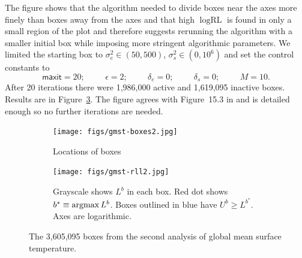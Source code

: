 \documentclass{report}
\newcommand{\textcompute}{\textsf}
\newcommand{\RLorig}{\text{RL}}
\newcommand{\logRLorig}{\log\RLorig}
\newcommand{\sigssq}{\sigma_s^2}
\newcommand{\sigesq}{\sigma_e^2}
\newcommand{\maxit}{\textcompute{maxit}}
\newcommand{\argmax}{\operatornamewithlimits{argmax}}
\begin{document}
The figure shows that the algorithm needed to divide boxes near the axes more finely than boxes away from the axes and that high $\logRLorig$ is found in only a small region of the plot and therefore suggests rerunning the algorithm with a smaller initial box while imposing more stringent algorithmic parameters.  We limited the starting box to $\sigesq\in(50,500)$, $\sigssq\in(0,10^6)$ and set the control constants to 
\begin{equation*}
	\maxit=20; \hspace{1cm} \epsilon=2; \hspace{1cm}
	\delta_e=0; \hspace{1cm} \delta_s=0; \hspace{1cm} M=10.
\end{equation*}
After 20 iterations there were 1,986,000 active and 1,619,095 inactive boxes.  Results are in Figure~\ref{fig:gmst2}.  The figure agrees with Figure~15.3 in \cite{hodges:2013} and is detailed enough so no further iterations are needed.

\begin{figure}
  \begin{subfigure}{.5\textwidth}
    \centering
    \texttt{[image: figs/gmst-boxes2.jpg]}
    \caption{Locations of boxes}
    \label{fig:gmst-boxes2}
  \end{subfigure}
  \begin{subfigure}{.5\textwidth}
    \centering
    \texttt{[image: figs/gmst-rll2.jpg]}
    \caption{Grayscale shows $L^b$ in each box.
                  Red dot shows $b^* \equiv\argmax L^b$.
	          Boxes outlined in blue have $U^b \ge L^{b^*}$.
	          Axes are logarithmic.}
    \label{fig:gmstrll2}
  \end{subfigure}
  \caption{The 3,605,095 boxes from the second analysis of global
                mean surface temperature.}
\label{fig:gmst2}
\end{figure}
\end{document}
